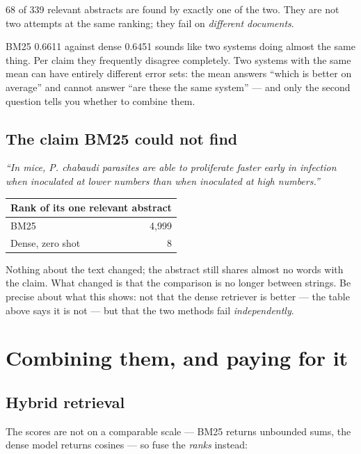 \documentclass[11pt,a4paper]{article}
\begin{document}
68 of 339 relevant abstracts are found by exactly one of the two. They are not
two attempts at the same ranking; they fail on \emph{different documents}.

\begin{keybox}[title={A mean hides the disagreement}]
BM25 0.6611 against dense 0.6451 sounds like two systems doing almost the same
thing. Per claim they frequently disagree completely. Two systems with the same
mean can have entirely different error sets: the mean answers ``which is better
on average'' and cannot answer ``are these the same system'' --- and only the
second question tells you whether to combine them.
\end{keybox}

\subsection{The claim BM25 could not find}

\emph{``In mice, P. chabaudi parasites are able to proliferate faster early in
infection when inoculated at lower numbers than when inoculated at high
numbers.''}

\begin{center}
\small
\begin{tabular}{lr}
\toprule
\multicolumn{2}{l}{\textbf{Rank of its one relevant abstract}} \\
\midrule
BM25             & 4{,}999 \\
Dense, zero shot & 8 \\
\bottomrule
\end{tabular}
\end{center}

Nothing about the text changed; the abstract still shares almost no words with
the claim. What changed is that the comparison is no longer between strings. Be
precise about what this shows: not that the dense retriever is better --- the
table above says it is not --- but that the two methods fail
\emph{independently}.

\section{Combining them, and paying for it}

\subsection{Hybrid retrieval}

The scores are not on a comparable scale --- BM25 returns unbounded sums, the
dense model returns cosines --- so fuse the \emph{ranks} instead:
\end{document}
